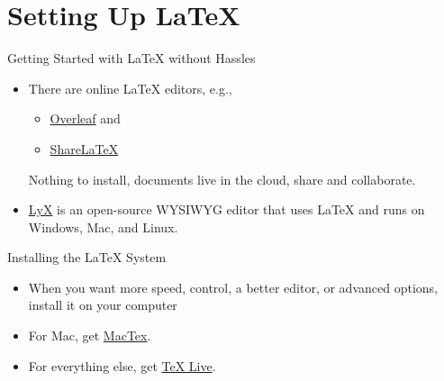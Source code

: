\section{Setting Up \LaTeX}


\begin{frame}{Getting Started with \LaTeX{} without Hassles}

\begin{itemize}
\item There are online \LaTeX{} editors, e.g.,
\begin{itemize}
\item \href{https://www.overleaf.com/}{Overleaf} and 
\item \href{https://www.sharelatex.com/}{ShareLaTeX}
\end{itemize}
Nothing to install, documents live in the cloud, share and collaborate.
\item \href{http://www.lyx.org/}{LyX} is an open-source WYSIWYG editor
  that uses \LaTeX{} and runs on Windows, Mac, and Linux.
\end{itemize}

\end{frame}

\begin{frame}{Installing the \LaTeX{} System}

\begin{itemize}
\item When you want more speed, control, a better editor, or advanced 
options, install it on your computer
\item For Mac, get \href{http://www.tug.org/mactex/}{MacTex}.
\item For everything else, get \href{http://www.tug.org/texlive/}{TeX Live}.
\end{itemize}

\end{frame}

